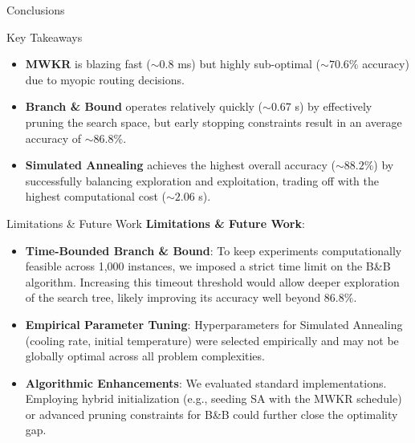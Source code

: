 \documentclass{beamer}
\begin{document}
\begin{frame}{Conclusions}
    \begin{block}{Key Takeaways}
        \begin{itemize}[<+->]
            \item \textbf{MWKR} is blazing fast ($\sim 0.8$ ms) but highly sub-optimal ($\sim 70.6\%$ accuracy) due to myopic routing decisions.
            \item \textbf{Branch \& Bound} operates relatively quickly ($\sim 0.67$ s) by effectively pruning the search space, but early stopping constraints result in an average accuracy of $\sim 86.8\%$.
            \item \textbf{Simulated Annealing} achieves the highest overall accuracy ($\sim 88.2\%$) by successfully balancing exploration and exploitation, trading off with the highest computational cost ($\sim 2.06$ s).
        \end{itemize}
    \end{block}
\end{frame}

\begin{frame}{Limitations \& Future Work}
    \textbf{Limitations \& Future Work}:
    \vspace{0.5em}
    \begin{itemize}[<+->]
        \item \textbf{Time-Bounded Branch \& Bound}: To keep experiments computationally feasible across 1,000 instances, we imposed a strict time limit on the B\&B algorithm. Increasing this timeout threshold would allow deeper exploration of the search tree, likely improving its accuracy well beyond $86.8\%$.
        \item \textbf{Empirical Parameter Tuning}: Hyperparameters for Simulated Annealing (cooling rate, initial temperature) were selected empirically and may not be globally optimal across all problem complexities.
        \item \textbf{Algorithmic Enhancements}: We evaluated standard implementations. Employing hybrid initialization (e.g., seeding SA with the MWKR schedule) or advanced pruning constraints for B\&B could further close the optimality gap.
    \end{itemize}
\end{frame}

\end{document}
